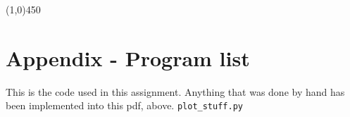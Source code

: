 \documentclass[11pt,a4paper,notitlepage]{article}
\begin{document}
\begin{center}
\line(1,0){450}
\end{center}

\newpage
\section{Appendix - Program list}
This is the code used in this assignment. Anything that was done by hand has been implemented into this pdf, above.
\lstset{style=pystyle}
\verb|plot_stuff.py|

\end{document}

